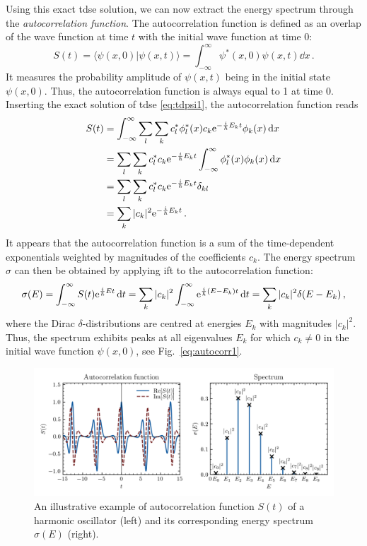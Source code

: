 Using this exact \acrshort{tdse} solution, we can now extract the energy spectrum through the \textit{autocorrelation function}. The autocorrelation function is defined as an overlap of the wave function at time $t$ with the initial wave function at time 0:
\begin{equation}
    S(t) = \langle \psi(x,0) | \psi(x,t) \rangle =\int_{-\infty}^{\infty}\psi^*(x,0) \psi(x,t) \dd x\, .
\end{equation}
It measures the probability amplitude of $\psi(x,t)$ being in the initial state $\psi(x,0)$. Thus, the autocorrelation function is always equal to 1 at time 0. Inserting the exact solution of \acrshort{tdse} \eqref{eq:tdpsi1}, the autocorrelation function reads
\begin{align}
    S(t) &= \int_{-\infty}^{\infty} \sum_l \sum_k c_l^* \phi_l^*(x) c_k \mathrm{e}^{-\frac{i}{\hbar}E_k t}\phi_k(x) \mathop{}\!\mathrm{d} x \notag\\
    &= \sum_l \sum_k c^*_l c_k \mathrm{e}^{-\frac{i}{\hbar}E_k t} \int_{-\infty}^{\infty}  \phi_l^*(x) \phi_k(x) \mathop{}\!\mathrm{d} x \notag\\
    &= \sum_l \sum_k c^*_l c_k \mathrm{e}^{-\frac{i}{\hbar}E_k t} \delta_{kl} \notag\\
    &= \sum_k |c_k|^2 \mathrm{e}^{-\frac{i}{\hbar}E_k t} \, .
\end{align}
It appears that the autocorrelation function is a sum of the time-dependent exponentials weighted by magnitudes of the coefficients $c_k$. The energy spectrum $\sigma$ can then be obtained by applying \acrshort{ift} to the autocorrelation function:
\begin{equation}
    \sigma(E) = \int_{-\infty}^{\infty} S(t) \mathrm{e}^{\frac{i}{\hbar}Et} \mathop{}\!\mathrm{d} t  = \sum_k |c_k|^2 \int_{-\infty}^{\infty} \mathrm{e}^{\frac{i}{\hbar}(E-E_k)t} \mathop{}\!\mathrm{d} t = \sum_k |c_k|^2 \delta(E-E_k) \, ,
    \label{eq:autocorr1}
\end{equation}
where the Dirac $\delta$-distributions are centred at energies $E_k$ with magnitudes $|c_k|^2$. Thus, the spectrum exhibits peaks at all eigenvalues $E_k$ for which $c_k\neq 0$ in the initial wave function $\psi(x,0)$, see Fig.~\ref{eq:autocorr1}.

\begin{figure}[ht!]
    \centering
    \includegraphics[width=0.9\linewidth]{scriptum/obrazky/autocorr/autocorr1.png}
    \caption{An illustrative example of autocorrelation function $S(t)$ of a harmonic oscillator (left) and its corresponding energy spectrum $\sigma(E)$ (right).}
    \label{fig:autocorr1}
\end{figure}

